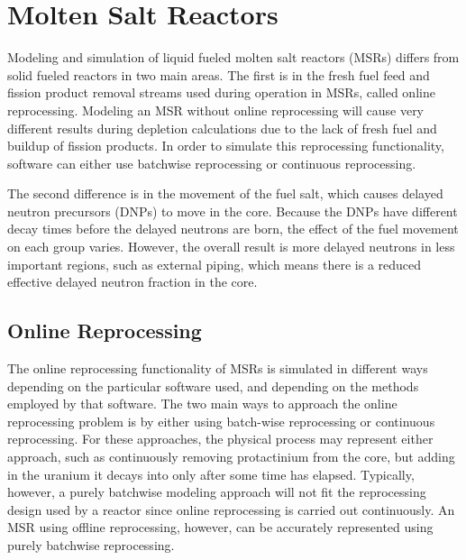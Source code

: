 \renewcommand*\descriptionlabel[1]{\hspace\leftmargin$#1$}
\setcounter{tocdepth}{5}
\setcounter{secnumdepth}{5}

\section{Molten Salt Reactors}

Modeling and simulation of liquid fueled molten salt reactors (MSRs) differs from solid fueled reactors in two main areas. The first is in the fresh fuel feed and fission product removal streams used during operation in MSRs, called online reprocessing. Modeling an MSR without online reprocessing will cause very different results during depletion calculations due to the lack of fresh fuel and buildup of fission products. In order to simulate this reprocessing functionality, software can either use batchwise reprocessing or continuous reprocessing.

The second difference is in the movement of the fuel salt, which causes delayed neutron precursors (DNPs) to move in the core. Because the DNPs have different decay times before the delayed neutrons are born, the effect of the fuel movement on each group varies. However, the overall result is more delayed neutrons in less important regions, such as external piping, which means there is a reduced effective delayed neutron fraction in the core.

\subsection{Online Reprocessing}

The online reprocessing functionality of MSRs is simulated in different ways depending on the particular software used, and depending on the methods employed by that software. The two main ways to approach the online reprocessing problem is by either using batch-wise reprocessing or continuous reprocessing. For these approaches, the physical process may represent either approach, such as continuously removing protactinium from the core, but adding in the uranium it decays into only after some time has elapsed. Typically, however, a purely batchwise modeling approach will not fit the reprocessing design used by a reactor since online reprocessing is carried out continuously. An MSR using offline reprocessing, however, can be accurately represented using purely batchwise reprocessing.

